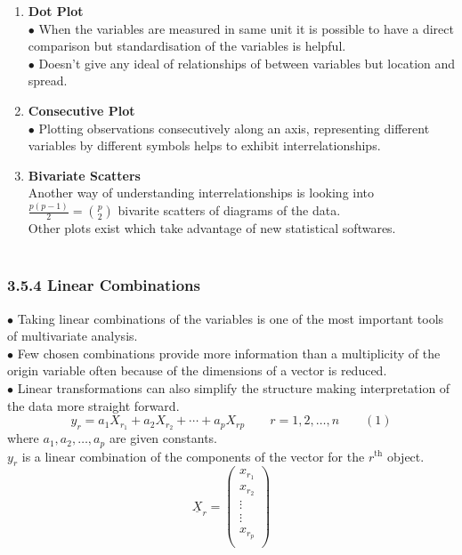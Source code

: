 \documentclass[11pt,a4paper]{article}
\theoremstyle{definition}
\begin{document}
\begin{enumerate}
\item \textbf{Dot Plot}\\
$\bullet$ When the variables are measured in same unit it is possible to have a direct comparison but standardisation of the variables is helpful.\\
$\bullet$ Doesn't give any  ideal of relationships of between variables but location and spread.
\item \textbf{Consecutive Plot}\\
$\bullet$ Plotting observations consecutively along an axis, representing different variables by different symbols helps to exhibit interrelationships.
\item \textbf{Bivariate Scatters}\\
Another way of understanding interrelationships is looking into $\displaystyle{\frac{p(p-1)}{2}}=\binom{p}{2}$ bivarite scatters of  diagrams of the data.\\
Other plots exist which take advantage of new statistical softwares.\\\\
\end{enumerate}



\subsubsection*{3.5.4 Linear Combinations}
$\bullet$ Taking linear combinations of the variables is one of the most important tools of multivariate analysis.\\
$\bullet$ Few chosen combinations provide more information than a multiplicity of the origin variable often because of the dimensions of a vector is reduced.\\
$\bullet$ Linear transformations can also simplify the structure making interpretation of the data more straight forward.
$$y_r = a_1X_{r_1} + a_2X_{r_2}+\cdots+ a_pX_{rp}\qquad r=1,2,\ldots, n\qquad  (1)$$ where $a_1,a_2,\ldots,a_p$ are given constants.\\
$y_r$ is a linear combination of the components of the vector for the $r^{\text{th}}$ object.
$$\underline{X}_r=
\begin{pmatrix}
x_{r_1}\\
x_{r_2}\\
\vdots\\
\vdots\\
x_{r_p}\\
\end{pmatrix}
$$
\end{document}
